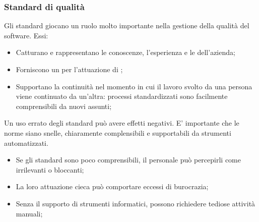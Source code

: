 
\subsubsection{Standard di qualità}
Gli standard giocano un ruolo molto importante nella gestione della qualità del software. Essi:
\begin{itemize}
	\item Catturano e rappresentano le conoscenze, l'esperienza e le  dell'azienda;
	\item Forniscono un  per l'attuazione di ;
	\item Supportano la continuità nel momento in cui il lavoro svolto da una persona viene continuato da un'altra: processi standardizzati sono facilmente comprensibili da nuovi assunti;
\end{itemize}

Un uso errato degli standard può avere effetti negativi. E' importante che le norme siano snelle, chiaramente complensibili e supportabili da strumenti automatizzati.
\begin{itemize}
	\item Se gli standard sono poco comprensibili, il personale può percepirli come irrilevanti o bloccanti;
	\item La loro attuazione cieca può comportare eccessi di burocrazia;
	\item Senza il supporto di strumenti informatici, possono richiedere tediose attività manuali;
\end{itemize}

